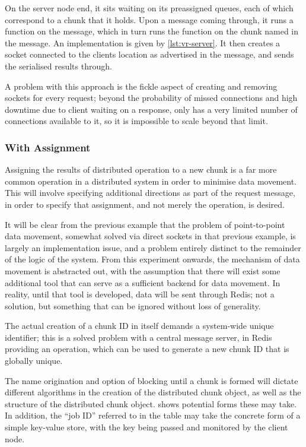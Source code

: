 On the server node end, it sits waiting on its preassigned queues, each of which correspond to a chunk that it holds.
Upon a message coming through, it runs a  function on the message, which in turn runs the function on the chunk named in the message.
An implementation is given by \cref{lst:vr-server}.
It then creates a socket connected to the clients location as advertised in the message, and sends the serialised results through.

A problem with this approach is the fickle aspect of creating and removing sockets for every request; beyond the probability of missed connections and high downtime due to client waiting on a response, \R{} only has a very limited number of connections available to it, so it is impossible to scale beyond that limit.

\subsubsection{With Assignment}

Assigning the results of distributed operation to a new chunk is a far more common operation in a distributed system in order to minimise data movement.
This will involve specifying additional directions as part of the request message, in order to specify that assignment, and not merely the operation, is desired.

It will be clear from the previous example that the problem of point-to-point data movement, somewhat solved via direct sockets in that previous example, is largely an implementation issue, and a problem entirely distinct to the remainder of the logic of the system.
From this experiment onwards, the mechanism of data movement is abstracted out, with the assumption that there will exist some additional tool that can serve as a sufficient backend for data movement.
In reality, until that tool is developed, data will be sent through Redis; not a solution, but something that can be ignored without loss of generality.

The actual creation of a chunk ID in itself demands a system-wide unique identifier; this is a solved problem with a central message server, in Redis providing an  operation, which can be used to generate a new chunk ID that is globally unique.

The name origination and option of blocking until a chunk is formed will dictate different algorithms in the creation of the distributed chunk object, as well as the structure of the distributed chunk object.
 shows potential forms these may take.
In addition, the ``job ID'' referred to in the table may take the concrete form of a simple key-value store, with the key being passed and monitored by the client node.

